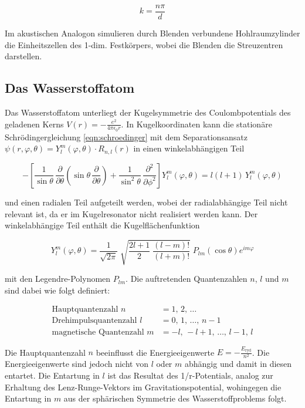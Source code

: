 \begin{equation*}
k = \frac{n \pi}{d} 
\end{equation*}

\noindent
Im akustischen Analogon simulieren durch Blenden verbundene Hohlraumzylinder die Einheitszellen des 1-dim. Festkörpers, wobei die Blenden die Streuzentren darstellen.


\subsection{Das Wasserstoffatom}

\noindent
Das Wasserstoffatom unterliegt der Kugelsymmetrie des Coulombpotentials des geladenen Kerns $V(r) = -\frac{e^2}{4 \pi \epsilon_0 r}$.
In Kugelkoordinaten kann die stationäre Schrödingergleichung \ref{eqn:schroedinger} mit dem Separationsansatz  $\psi(r,\varphi,\theta) = Y^m_l(\varphi,\theta) \cdot R_{n,l}(r)$
in einen winkelabhängigen Teil

\begin{equation*}
    -\left[\frac{1}{\sin \theta} \, \frac{\partial}{\partial \theta} \left(\sin \theta \, \frac{\partial}{\partial \theta}\right) + \frac{1}{\sin^2 \theta} \, \frac{\partial^2}{\partial \phi^2}\right] Y^m_l(\varphi,\theta) = l(l+1) \, Y^m_l(\varphi,\theta)
\end{equation*}

\noindent
und einen radialen Teil aufgeteilt werden, wobei der radialabhängige Teil nicht relevant ist, da er im Kugelresonator nicht realisiert werden kann.
Der winkelabhängige Teil enthält die Kugelflächenfunktion

\begin{equation}
    Y^m_l(\varphi,\theta) = \frac{1}{\sqrt{2\pi}} \; \sqrt{\frac{2l+1}{2} \; \frac{(l-m)!}{(l+m)!}} \; P_{lm}\left(\cos \theta\right) e^{i m \varphi}
\end{equation}

\noindent
mit den Legendre-Polynomen $P_{lm}$.
Die auftretenden Quantenzahlen $n$, $l$ und $m$ sind dabei wie folgt definiert:

\begin{align*}
\text{Hauptquantenzahl  }    n &= 1, \, 2, \, \ldots  \\
\text{Drehimpulsquantenzahl  }    l &= 0, \, 1, \, \ldots, \, n-1 \\
\text{magnetische Quantenzahl  }    m &= -l, \, -l+1, \, \ldots, \, l-1, \, l
\end{align*}

\noindent
Die Hauptquantenzahl $n$ beeinflusst die Energieeigenwerte $E = -\frac{E_{\text{ryd}}}{n^2}$.
Die Energieeigenwerte sind jedoch nicht von $l$ oder $m$ abhängig und damit in diesen entartet. 
Die Entartung in $l$ ist das Resultat des 1/r-Potentials, analog zur Erhaltung des Lenz-Runge-Vektors im Gravitationspotential, wohingegen die Entartung in $m$ aus der sphärischen Symmetrie des Wasserstoffproblems folgt.

